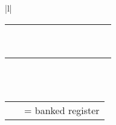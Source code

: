 \begin{tabular}{|l|}
\begin{tabular}[b]{|l|c|l|c|l|c|l|c|l|c|l|}
	\hhline{-*{5}{~-}}
	\register{R11} & & \cellcolor{gray!25}\register{R11\_fiq} & & \register{R11} & & \register{R11} & & \register{R11} & & \register{R11}\\
	\hhline{-*{5}{~-}}
	\register{R12} & & \cellcolor{gray!25}\register{R12\_fiq} & & \register{R12} & & \register{R12} & & \register{R12} & & \register{R12}\\
	\hhline{-*{5}{~-}}
	\register{R13} & & \cellcolor{gray!25}\register{R13\_fiq} & & \cellcolor{gray!25}\register{R13\_svc} & & \cellcolor{gray!25}\register{R13\_abt} & & \cellcolor{gray!25}\register{R13\_irq} & & \cellcolor{gray!25}\register{R13\_und} \\
	\hhline{-*{5}{~-}}
	\register{R14} & & \cellcolor{gray!25}\register{R14\_fiq} & & \cellcolor{gray!25}\register{R14\_svc} & & \cellcolor{gray!25}\register{R14\_abt} & & \cellcolor{gray!25}\register{R14\_irq} & & \cellcolor{gray!25}\register{R14\_und} \\
	\hhline{-*{5}{~-}}
	\register{R15 (pc)} & & \register{R15 (pc)} & & \register{R15 (pc)} & & \register{R15 (pc)} & & \register{R15 (pc)} & & \register{R15 (pc)} \\
	\hhline{-*{5}{~-}}
	\multicolumn{1}{c}{} \\
	\hhline{-*{5}{~-}}
	\register{CPSR} & & \register{CPSR} & & \register{CPSR} & & \register{CPSR} & & \register{CPSR} & & \register{CPSR} \\
	\hhline{-*{5}{~-}}
	\multicolumn{1}{c}{} & & \cellcolor{gray!25}\register{SPSR\_fiq} & & \cellcolor{gray!25}\register{SPSR\_svc} & & \cellcolor{gray!25}\register{SPSR\_abt} & & \cellcolor{gray!25}\register{SPSR\_irq} & & \cellcolor{gray!25}\register{SPSR\_und} \\
	\hhline{~*{5}{~-}}
\end{tabular}\\
\\
\ttfamily
\small
\begin{tabular}{ll}\cellcolor{gray!25} \ & = banked register \\ \end{tabular} \\
\\
\hline
\end{tabular}
